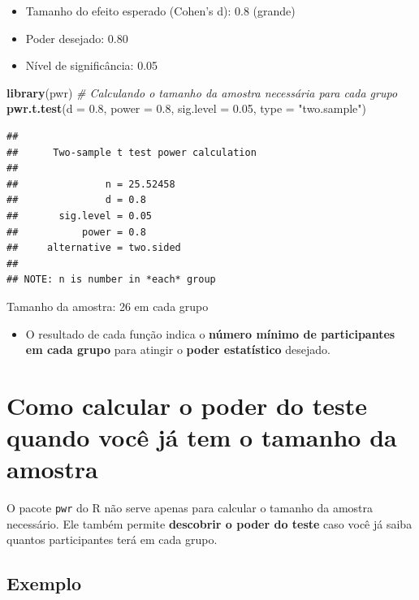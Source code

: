 \documentclass[
]{book}
\newenvironment{Shaded}{\begin{snugshade}}{\end{snugshade}}
\newcommand{\AttributeTok}[1]{\textcolor[rgb]{0.13,0.29,0.53}{#1}}
\newcommand{\CommentTok}[1]{\textcolor[rgb]{0.56,0.35,0.01}{\textit{#1}}}
\newcommand{\FloatTok}[1]{\textcolor[rgb]{0.00,0.00,0.81}{#1}}
\newcommand{\FunctionTok}[1]{\textcolor[rgb]{0.13,0.29,0.53}{\textbf{#1}}}
\newcommand{\NormalTok}[1]{#1}
\newcommand{\StringTok}[1]{\textcolor[rgb]{0.31,0.60,0.02}{#1}}
\providecommand{\tightlist}{%
  \setlength{\itemsep}{0pt}\setlength{\parskip}{0pt}}
\begin{document}
\begin{itemize}
\tightlist
\item
  Tamanho do efeito esperado (Cohen's d): 0.8 (grande)\\
\item
  Poder desejado: 0.80
\item
  Nível de significância: 0.05
\end{itemize}

\begin{Shaded}
\begin{Highlighting}[]
\FunctionTok{library}\NormalTok{(pwr)}
\CommentTok{\# Calculando o tamanho da amostra necessária para cada grupo}
\FunctionTok{pwr.t.test}\NormalTok{(}\AttributeTok{d =} \FloatTok{0.8}\NormalTok{, }\AttributeTok{power =} \FloatTok{0.8}\NormalTok{, }\AttributeTok{sig.level =} \FloatTok{0.05}\NormalTok{, }\AttributeTok{type =} \StringTok{"two.sample"}\NormalTok{)}
\end{Highlighting}
\end{Shaded}

\begin{verbatim}
## 
##      Two-sample t test power calculation 
## 
##               n = 25.52458
##               d = 0.8
##       sig.level = 0.05
##           power = 0.8
##     alternative = two.sided
## 
## NOTE: n is number in *each* group
\end{verbatim}

Tamanho da amostra: 26 em cada grupo

\begin{itemize}
\tightlist
\item
  O resultado de cada função indica o \textbf{número mínimo de participantes em cada grupo} para atingir o \textbf{poder estatístico} desejado.
\end{itemize}

\section{Como calcular o poder do teste quando você já tem o tamanho da amostra}\label{como-calcular-o-poder-do-teste-quando-vocuxea-juxe1-tem-o-tamanho-da-amostra}

O pacote \texttt{pwr} do R não serve apenas para calcular o tamanho da amostra necessário. Ele também permite \textbf{descobrir o poder do teste} caso você já saiba quantos participantes terá em cada grupo.

\subsection{Exemplo}\label{exemplo}
\end{document}
